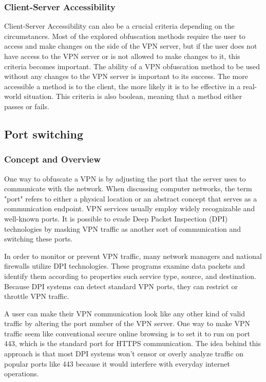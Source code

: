 \documentclass[12pt, fleqn, a4paper]{article}
\begin{document}
\subsubsection{Client-Server Accessibility}
Client-Server Accessibility can also be a crucial criteria depending on the circumstances. Most of the explored obfuscation methods require the user to access and make changes on the side of the VPN server, but if the user does not have access to the VPN server or is not allowed to make changes to it, this criteria becomes important. The ability of a VPN obfuscation method to be used without any changes to the VPN server is important to its success. The more accessible a method is to the client, the more likely it is to be effective in a real-world situation. This criteria is also boolean, meaning that a method either passes or fails.
\subsection{Port switching}
\subsubsection{Concept and Overview}
One way to obfuscate a VPN is by adjusting the port that the server uses to communicate with the network. When discussing computer networks, the term "port" refers to either a physical location or an abstract concept that serves as a communication endpoint. VPN services usually employ widely recognizable and well-known ports. It is possible to evade Deep Packet Inspection (DPI) technologies by masking VPN traffic as another sort of communication and switching these ports.

In order to monitor or prevent VPN traffic, many network managers and national firewalls utilize DPI technologies. These programs examine data packets and identify them according to properties such service type, source, and destination. Because DPI systems can detect standard VPN ports, they can restrict or throttle VPN traffic.

A user can make their VPN communication look like any other kind of valid traffic by altering the port number of the VPN server. One way to make VPN traffic seem like conventional secure online browsing is to set it to run on port 443, which is the standard port for HTTPS communication. The idea behind this approach is that most DPI systems won't censor or overly analyze traffic on popular ports like 443 because it would interfere with everyday internet operations.
\end{document}
